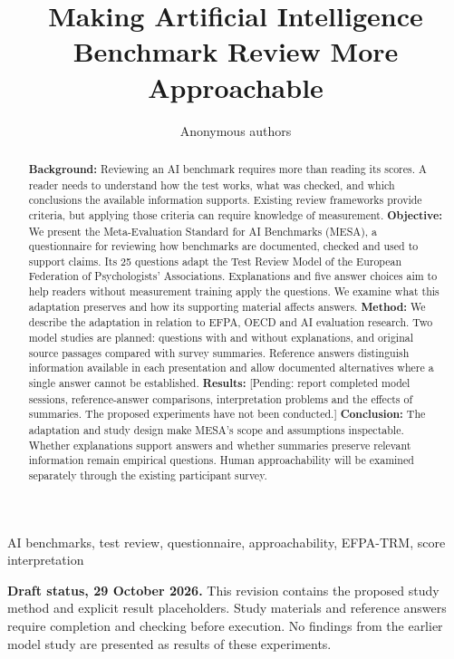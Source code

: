 \documentclass[10pt,conference]{IEEEtran}
\begin{document}
\title{Making Artificial Intelligence Benchmark Review More Approachable}
\author{Anonymous authors}
\maketitle
\begin{abstract}
\textbf{Background:} Reviewing an AI benchmark requires more than reading its scores. A reader needs to understand how the test works, what was checked, and which conclusions the available information supports. Existing review frameworks provide criteria, but applying those criteria can require knowledge of measurement.
\textbf{Objective:} We present the Meta-Evaluation Standard for AI Benchmarks (MESA), a questionnaire for reviewing how benchmarks are documented, checked and used to support claims. Its 25 questions adapt the Test Review Model of the European Federation of Psychologists' Associations. Explanations and five answer choices aim to help readers without measurement training apply the questions. We examine what this adaptation preserves and how its supporting material affects answers.
\textbf{Method:} We describe the adaptation in relation to EFPA, OECD and AI evaluation research. Two model studies are planned: questions with and without explanations, and original source passages compared with survey summaries. Reference answers distinguish information available in each presentation and allow documented alternatives where a single answer cannot be established.
\textbf{Results:} [Pending: report completed model sessions, reference-answer comparisons, interpretation problems and the effects of summaries. The proposed experiments have not been conducted.]
\textbf{Conclusion:} The adaptation and study design make MESA's scope and assumptions inspectable. Whether explanations support answers and whether summaries preserve relevant information remain empirical questions. Human approachability will be examined separately through the existing participant survey.
\end{abstract}
\begin{IEEEkeywords}
AI benchmarks, test review, questionnaire, approachability, EFPA-TRM, score interpretation
\end{IEEEkeywords}

\noindent\textbf{Draft status, 29 October 2026.} This revision contains the proposed study method and explicit result placeholders. Study materials and reference answers require completion and checking before execution. No findings from the earlier model study are presented as results of these experiments.
\end{document}

